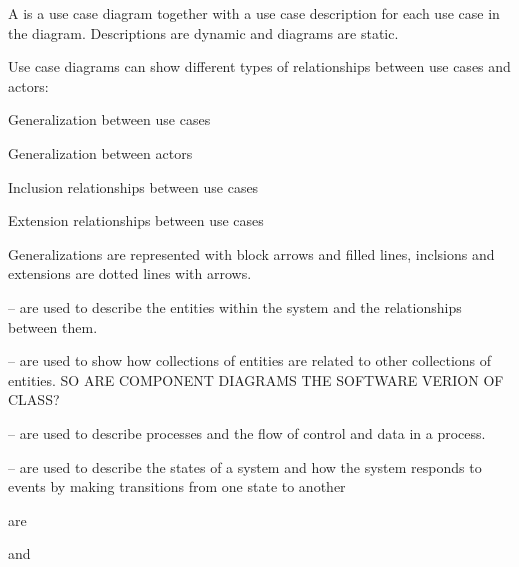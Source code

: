 \begin{compactitem}
\item A
is a use
case diagram
together with a
use
case description
for each use case in the diagram.
Descriptions are dynamic and diagrams are static.

\item Use case diagrams can show different types of relationships between use cases and actors:
\begin{compactitem}
\item Generalization between use cases
\item Generalization between actors
\item Inclusion
relationships between use cases
\item Extension
relationships between use cases
\end{compactitem}
Generalizations are represented with block arrows and filled lines, inclsions and extensions are dotted lines with arrows.

\item {}
\begin{compactitem}
\item {} – are used to describe the entities within the system and the relationships between them.
\item {} – are used to show how collections of entities are related to other collections of entities. SO ARE COMPONENT DIAGRAMS THE SOFTWARE VERION OF CLASS?
\end{compactitem}
\item {}
\begin{compactitem}
\item {} – are used to describe processes and the flow of control and data in a process.
\item {} – are used to describe the states of a system and how the system responds to events by making
transitions from one state to another
\end{compactitem}
\item {}
 are
\begin{compactitem}
\item {} and
\item {}
\end{compactitem}
\end{compactitem}











